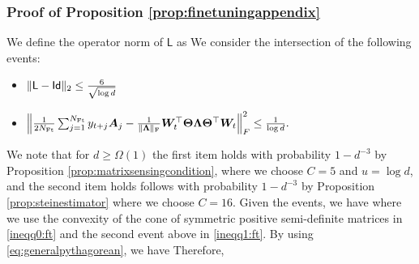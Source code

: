 \subsubsection{Proof of Proposition \ref{prop:finetuningappendix}}

We define the operator norm of $\mathsf{L}$ as 
We consider the intersection of the following events:
\begin{itemize}
    \item $\lVert\mathsf{L} - \mathsf{Id}\rVert_{2} \leq \frac{6}{\sqrt{ \log d }}$
    \item $\Big \lVert  \frac{1}{2 N_{\mathrm{Ft}}} \sum_{j = 1}^{N_{\mathrm{Ft}}} y_{t+j} \boldsymbol{A}_j - \frac{1}{\lVert\boldsymbol{\Lambda}\rVert_\mathrm{F}} \boldsymbol{W}_t^\top \boldsymbol{\Theta} \boldsymbol{\Lambda} \boldsymbol{\Theta}^\top \boldsymbol{W}_t  \Big \rVert_F^2 \leq \frac{1}{\log d}.$
\end{itemize}
We note that for $d \geq \Omega(1)$ the first item holds with probability $1 - d^{-3}$ by
Proposition \ref{prop:matrixsensingcondition}, where we choose $C = 5$ and $u = \log d$, and the second item holds follows  with probability $1 - d^{-3}$ by Proposition \ref{prop:steinestimator} where we choose $C = 16$. Given the events, we have
where we use the convexity of the cone of  symmetric positive semi-definite matrices in \eqref{ineqq0:ft} and the second event above in \eqref{ineqq1:ft}. By using \eqref{eq:generalpythagorean}, we have
 Therefore,  
